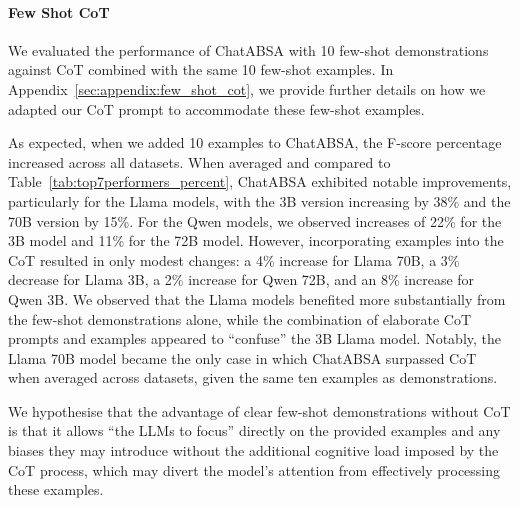\documentclass[11pt]{article}
\begin{document}




\paragraph{Few Shot CoT}
We evaluated the performance of ChatABSA with 10 few-shot demonstrations against CoT combined with the same 10 few-shot examples. In Appendix~\ref{sec:appendix:few_shot_cot}, we provide further details on how we adapted our CoT prompt to accommodate these few-shot examples.

As expected, when we added 10 examples to ChatABSA, the F-score percentage increased across all datasets. When averaged and compared to Table~\ref{tab:top7performers_percent}, ChatABSA exhibited notable improvements, particularly for the Llama models, with the 3B version increasing by 38\% and the 70B version by 15\%. For the Qwen models, we observed increases of 22\% for the 3B model and 11\% for the 72B model. However, incorporating examples into the CoT resulted in only modest changes: a 4\% increase for Llama 70B, a 3\% decrease for Llama 3B, a 2\% increase for Qwen 72B, and an 8\% increase for Qwen 3B. We observed that the Llama models benefited more substantially from the few-shot demonstrations alone, while the combination of elaborate CoT prompts and examples appeared to ``confuse'' the 3B Llama model. Notably, the Llama 70B model became the only case in which ChatABSA surpassed CoT when averaged across datasets, given the same ten examples as demonstrations.

We hypothesise that the advantage of clear few-shot demonstrations without CoT is that it allows ``the LLMs to focus'' directly on the provided examples and any biases they may introduce without the additional cognitive load imposed by the CoT process, which may divert the model's attention from effectively processing these examples.
\end{document}
